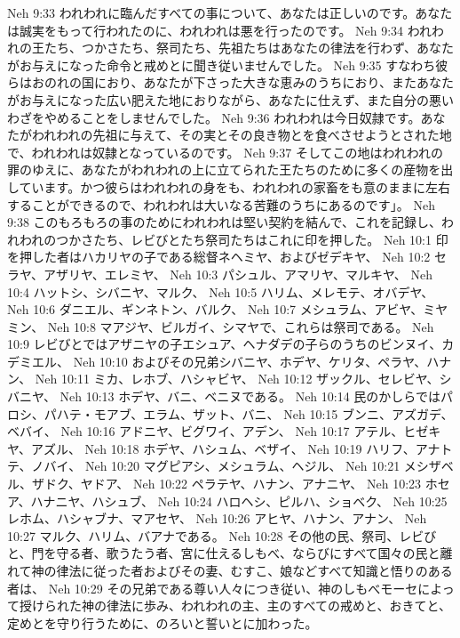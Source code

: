 Neh 9:33  われわれに臨んだすべての事について、あなたは正しいのです。あなたは誠実をもって行われたのに、われわれは悪を行ったのです。
Neh 9:34  われわれの王たち、つかさたち、祭司たち、先祖たちはあなたの律法を行わず、あなたがお与えになった命令と戒めとに聞き従いませんでした。
Neh 9:35  すなわち彼らはおのれの国におり、あなたが下さった大きな恵みのうちにおり、またあなたがお与えになった広い肥えた地におりながら、あなたに仕えず、また自分の悪いわざをやめることをしませんでした。
Neh 9:36  われわれは今日奴隷です。あなたがわれわれの先祖に与えて、その実とその良き物とを食べさせようとされた地で、われわれは奴隷となっているのです。
Neh 9:37  そしてこの地はわれわれの罪のゆえに、あなたがわれわれの上に立てられた王たちのために多くの産物を出しています。かつ彼らはわれわれの身をも、われわれの家畜をも意のままに左右することができるので、われわれは大いなる苦難のうちにあるのです」。
Neh 9:38  このもろもろの事のためにわれわれは堅い契約を結んで、これを記録し、われわれのつかさたち、レビびとたち祭司たちはこれに印を押した。
Neh 10:1  印を押した者はハカリヤの子である総督ネヘミヤ、およびゼデキヤ、
Neh 10:2  セラヤ、アザリヤ、エレミヤ、
Neh 10:3  パシュル、アマリヤ、マルキヤ、
Neh 10:4  ハットシ、シバニヤ、マルク、
Neh 10:5  ハリム、メレモテ、オバデヤ、
Neh 10:6  ダニエル、ギンネトン、バルク、
Neh 10:7  メシュラム、アビヤ、ミヤミン、
Neh 10:8  マアジヤ、ビルガイ、シマヤで、これらは祭司である。
Neh 10:9  レビびとではアザニヤの子エシュア、ヘナダデの子らのうちのビンヌイ、カデミエル、
Neh 10:10  およびその兄弟シバニヤ、ホデヤ、ケリタ、ペラヤ、ハナン、
Neh 10:11  ミカ、レホブ、ハシャビヤ、
Neh 10:12  ザックル、セレビヤ、シバニヤ、
Neh 10:13  ホデヤ、バニ、ベニヌである。
Neh 10:14  民のかしらではパロシ、パハテ・モアブ、エラム、ザット、バニ、
Neh 10:15  ブンニ、アズガデ、ベバイ、
Neh 10:16  アドニヤ、ビグワイ、アデン、
Neh 10:17  アテル、ヒゼキヤ、アズル、
Neh 10:18  ホデヤ、ハシュム、ベザイ、
Neh 10:19  ハリフ、アナトテ、ノバイ、
Neh 10:20  マグピアシ、メシュラム、ヘジル、
Neh 10:21  メシザベル、ザドク、ヤドア、
Neh 10:22  ペラテヤ、ハナン、アナニヤ、
Neh 10:23  ホセア、ハナニヤ、ハシュブ、
Neh 10:24  ハロヘシ、ピルハ、ショベク、
Neh 10:25  レホム、ハシャブナ、マアセヤ、
Neh 10:26  アヒヤ、ハナン、アナン、
Neh 10:27  マルク、ハリム、バアナである。
Neh 10:28  その他の民、祭司、レビびと、門を守る者、歌うたう者、宮に仕えるしもべ、ならびにすべて国々の民と離れて神の律法に従った者およびその妻、むすこ、娘などすべて知識と悟りのある者は、
Neh 10:29  その兄弟である尊い人々につき従い、神のしもべモーセによって授けられた神の律法に歩み、われわれの主、主のすべての戒めと、おきてと、定めとを守り行うために、のろいと誓いとに加わった。
